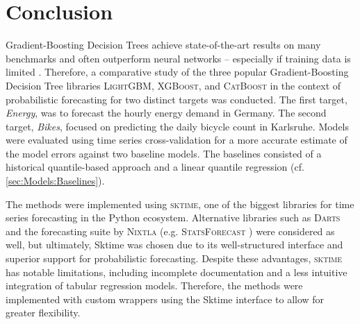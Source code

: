\newpage
\section{Conclusion}
\label{ch:Conclusion}
Gradient-Boosting Decision Trees achieve state-of-the-art results on many benchmarks and often outperform neural networks -- especially if training data is limited \parencites{shwartz-ziv_tabular_2021, grinsztajn_why_2022}. Therefore, a comparative study of the three popular Gradient-Boosting Decision Tree libraries \textsc{LightGBM}, \textsc{XGBoost}, and \textsc{CatBoost} in the context of probabilistic forecasting for two distinct targets was conducted. The first target, \textit{Energy}, was to forecast the hourly energy demand in Germany. The second target, \textit{Bikes}, focused on predicting the daily bicycle count in Karlsruhe. Models were evaluated using time series cross-validation for a more accurate estimate of the model errors against two baseline models. The baselines consisted of a historical quantile-based approach and a linear quantile regression (cf. \cref{sec:Models:Baselines}).

The methods were implemented using \textsc{sktime}, one of the biggest libraries for time series forecasting in the Python ecosystem. Alternative libraries such as \textsc{Darts} \parencite{herzen_darts_2022} and the forecasting suite by \textsc{Nixtla} (e.g. \textsc{StatsForecast} \parencite{azul_garza_statsforecast_2022}) were considered as well, but ultimately, Sktime was chosen due to its well-structured interface and superior support for probabilistic forecasting. Despite these advantages, \textsc{sktime} has notable limitations, including incomplete documentation and a less intuitive integration of tabular regression models. Therefore, the methods were implemented with custom wrappers using the Sktime interface to allow for greater flexibility.

